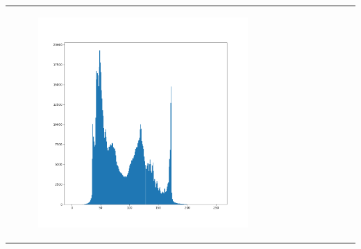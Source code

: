 \begin{frame}
\begin{tabular}{ccc}
\begin{minipage}{0.3\textwidth}
\begin{figure}[H]
	    \includegraphics[width=\textwidth]{images/histoLowContrast.png}
	     \end{figure}
        \end{minipage}
        &
        \begin{minipage}{0.3\textwidth}
            
            \begin{figure}[H]


\end{figure}
\end{minipage}
\end{tabular}
\end{frame}
